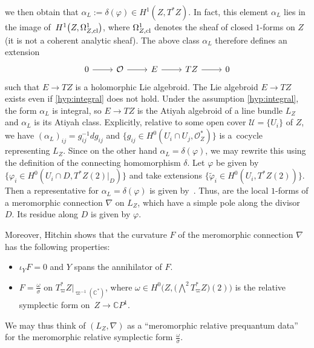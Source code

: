 \documentclass[pdftex]{sigma}
\numberwithin{equation}{section}
\theoremstyle{definition}
\newcommand\C{{\mathbb C}}
\begin{document}
we then obtain that
$\alpha_L := \delta(\varphi) \in H^1(Z, T^*Z)$.
In fact, this element $\alpha_L $ lies in the image of~$H^1\bigl(Z, \Omega_{Z,{\rm cl}}^1\bigr)$, where $\Omega^1_{Z,{\rm cl}}$ denotes the sheaf
of closed $1$-forms on $Z$ (it is not a coherent analytic sheaf). The above class $\alpha_L$ therefore defines an extension
\[
\begin{tikzcd}
0\arrow[r] & \mathcal O \arrow[r] & E \arrow[r] & TZ \arrow[r] & 0
\end{tikzcd}
\]
such that $E \longrightarrow TZ$ is a holomorphic Lie algebroid. The Lie algebroid $E \longrightarrow TZ$ exists even if \eqref{hyp:integral} does not hold.
Under the assumption \eqref{hyp:integral}, the form $\alpha_L$ is integral, so $E \longrightarrow TZ$ is the Atiyah algebroid of a line bundle $L_Z$ and $\alpha_L$ is its Atiyah class.
Explicitly, relative to some open cover $\mathcal U = \{U_i\}$ of $Z$, we have
$
(\alpha_L)_{ij} = g_{ij}^{-1}dg_{ij}
$
and $\bigl\{g_{ij}\in H^0(U_{i}\cap U_j, \mathcal O_Z^*)\bigr\}$ is a~cocycle representing $L_Z$.
Since on the other hand $\alpha_L = \delta(\varphi)$, we may rewrite this using the definition of the connecting homomorphism $\delta$.
Let $\varphi$ be given by $\bigl\{\varphi_i \in H^0(U_i\cap D, T^*Z(2)|_D)\bigr\}$ and take extensions $\bigl\{\widetilde\varphi_i
 \in H^0(U_i, T^*Z(2))\bigr\}$.
Then a representative for $\alpha_L = \delta(\varphi)$ is given by~.
Thus,  are the local $1$-forms of a meromorphic connection $\nabla$
on $L_Z$, which have a simple pole along the divisor $D$. Its residue along $D$ is given by $\varphi$.

Moreover, Hitchin shows that the curvature $F$ of the meromorphic connection $\nabla$ has the following properties:
\begin{itemize}\itemsep=0pt
\item $\iota_Y F = 0$ and $Y$ spans the annihilator of $ F$.

\item $ F = \frac{\omega}{\sigma}$ on $T_\varpi^*Z|_{\varpi^{-1}(\C^*)}$, where $\omega
 \in H^0\bigl(Z, \bigl(\bigwedge^2T^*_\varpi Z\bigr)(2)\bigr)$ is the relative symplectic form on~${Z \longrightarrow \C P^1}$.
\end{itemize}
We may thus think of $(L_Z, \nabla)$ as a ``meromorphic relative prequantum data'' for the meromorphic
relative symplectic form $\frac{\omega}{\sigma}$.
\end{document}
